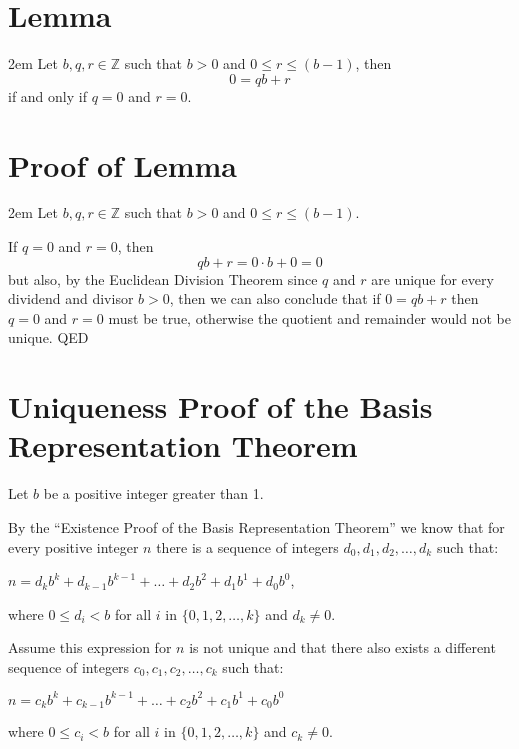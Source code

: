 \documentclass{article}
\newenvironment{jprIn}{\begin{adjustwidth}{2em}{}}{\end{adjustwidth}}
\begin{document}
\section*{Lemma}
\begin{jprIn}
Let $b, q, r \in{} \mathbb{Z}$ such that $b>0$ and $0\le{}r\le(b-1)$, then
\[0=qb+r\]
if and only if $q=0$ and $r=0$.
\end{jprIn}

\section*{Proof of Lemma}
\begin{jprIn}
Let $b, q, r \in{} \mathbb{Z}$ such that $b>0$ and $0\le{}r\le{}(b-1)$.

If $q=0$ and $r=0$, then
\[qb+r=0\cdot{}b+0=0\]
but also, by the Euclidean Division Theorem since $q$ and $r$ are unique for every dividend and divisor $b>0$,
then we can also conclude that if $0=qb+r$ then $q=0$ and $r=0$ must be true, otherwise the quotient and remainder
would not be unique. QED
\end{jprIn}

\section*{Uniqueness Proof of the Basis Representation Theorem}

Let $b$ be a positive integer greater than 1.

By the ``Existence Proof of the Basis Representation Theorem'' we know
that for every positive integer $n$ there is a sequence
of integers $d_0, d_1, d_2,\dots{},d_k$ such that:

\hspace{3em}$n=d_kb^k+d_{k-1}b^{k-1}+\dots+d_2b^2+d_1b^1+d_0b^0$,

\hspace{3em}where $0\le{}d_i<b$ for all $i$ in $\{0,1,2,\dots{},k\}$ and $d_k\ne0$.

Assume this expression for $n$ is not unique and that there also exists
a different sequence
of integers $c_0, c_1, c_2,\dots{},c_k$ such that:

\hspace{3em}$n=c_kb^k+c_{k-1}b^{k-1}+\dots+c_2b^2+c_1b^1+c_0b^0$

\hspace{3em}where $0\le{}c_i<b$ for all $i$ in $\{0,1,2,\dots{},k\}$ and $c_k\ne0$.
\end{document}
